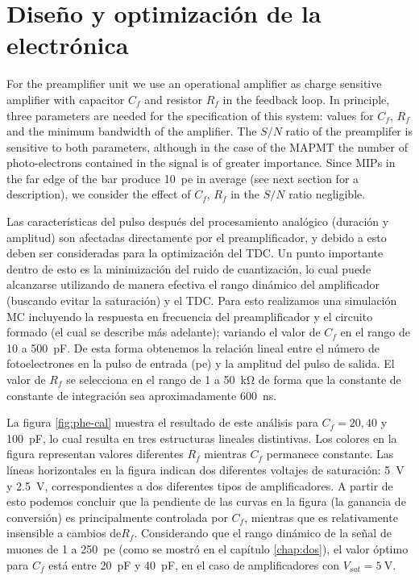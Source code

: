 \section{Diseño y optimización de la electrónica}

For the preamplifier unit we use an operational amplifier as charge sensitive amplifier with capacitor $C_{f}$ and resistor $R_{f}$ in the feedback loop. In principle, three parameters are needed for the specification of this system: values for $C_{f}$, $R_{f}$ and the minimum bandwidth of the amplifier. The $S/N$ ratio of the preamplifer is sensitive to both parameters, although in the case of the MAPMT the number of photo-electrons contained in the signal is of greater importance. Since MIPs in the far edge of the bar produce  \SI{10}{pe} in average (see next section for a description), we consider the effect of $C_{f}$, $R_{f}$ in the $S/N$ ratio negligible.

Las características del pulso después del procesamiento analógico (duración y amplitud) son afectadas directamente por el preamplificador, y debido a esto deben ser consideradas para la optimización del TDC. Un punto importante dentro de esto es la minimización del ruido de cuantización, lo cual puede alcanzarse utilizando de manera efectiva el rango dinámico del amplificador (buscando evitar la saturación) y el TDC. Para esto realizamos una simulación MC incluyendo la respuesta en frecuencia del preamplificador y el circuito formado (el cual se describe más adelante); variando el valor de $C_{f}$ en el rango de \num{10} a \SI{500}{\pico\farad}. De esta forma obtenemos la relación lineal entre el número de fotoelectrones en la pulso de entrada (\si{pe}) y la amplitud del pulso de salida. El valor de $R_{f}$ se selecciona en el rango de \num{1} a \SI{50}{\kilo\ohm} de forma que la constante de constante de integración sea aproximadamente \SI{600}{\ns}.

La figura \ref{fig:phe-cal} muestra el resultado de este análisis para $C_ {f}=20,40$ y \SI{100}{\pico\farad}, lo cual resulta en tres estructuras lineales distintivas. Los colores en la figura representan valores diferentes $R_{f}$ mientras $C_{f}$ permanece constante. Las líneas horizontales en la figura indican dos diferentes voltajes de saturación: \SI{5}{\volt} y \SI{2.5}{\volt}, correspondientes a dos diferentes tipos de amplificadores. A partir de esto podemos concluir que la pendiente de las curvas en la figura (la ganancia de conversión) es principalmente controlada por $C_{f}$, mientras que es relativamente insensible a cambios de$R_{f}$. Considerando que el rango dinámico de la señal de muones de \num{1} a \SI{250}{pe} (como se mostró en el capítulo \ref{chap:dos}), el valor óptimo para $C_{f}$ está entre \SI{20}{\pico\farad} y \SI{40}{\pico\farad}, en el caso de amplificadores con $V_{sat}=\SI{5}{\volt}$.

